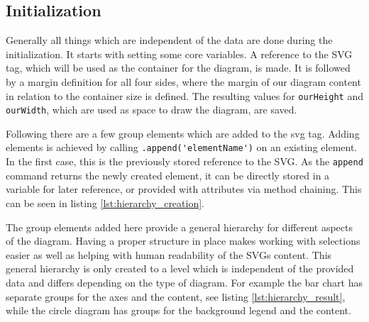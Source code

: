 \subsection{Initialization}
Generally all things which are independent of the data are done during the initialization. It starts with setting some core variables. A reference to the SVG tag, which will be used as the container for the diagram, is made. It is followed by a margin definition for all four sides, where the margin of our diagram content in relation to the container size is defined. The resulting values for \verb|ourHeight| and \verb|ourWidth|, which are used as space to draw the diagram, are saved. 

Following there are a few group elements which are added to the svg tag. Adding elements is achieved by calling \verb|.append('elementName')| on an existing element. In the first case, this is the previously stored reference to the SVG. As the \verb|append| command returns the newly created element, it can be directly stored in a variable for later reference, or provided with attributes via method chaining.  This can be seen in listing \ref{lst:hierarchy_creation}.

The group elements added here provide a general hierarchy for different aspects of the diagram. Having a proper structure in place makes working with selections easier as well as helping with human readability of the SVGs content. This general hierarchy is only created to a level which is independent of the provided data and differs depending on the type of diagram. For example the bar chart has separate groups for the axes and the content, see listing \ref{lst:hierarchy_result}, while the circle diagram has groups for the background legend and the content.

